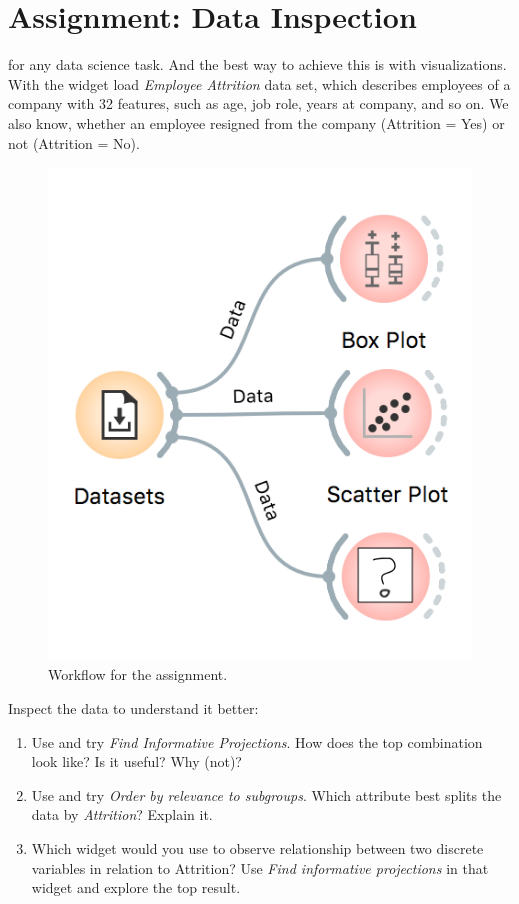\chapter{Assignment: Data Inspection}
\label{hw:data-inspection}

 for any data science task. And the best way to achieve this is with visualizations. With the  widget load \textit{Employee Attrition} data set, which describes employees of a company with 32 features, such as age, job role, years at company, and so on. We also know, whether an employee resigned from the company (Attrition = Yes) or not (Attrition = No).

\begin{figure}[h]
  \centering
  \includegraphics[scale=0.6]{workflow.png}%
  \caption{Workflow for the assignment.}
  \label{fig:data-inspection-workflow}
\end{figure}

Inspect the data to understand it better:
\begin{enumerate}
    \item Use  and try \textit{Find Informative Projections}. How does the top combination look like? Is it useful? Why (not)?
    \item Use  and try \textit{Order by relevance to subgroups}. Which attribute best splits the data by \textit{Attrition}? Explain it.
    \item Which widget would you use to observe relationship between two discrete variables in relation to Attrition? Use \textit{Find informative projections} in that widget and explore the top result.
\end{enumerate}